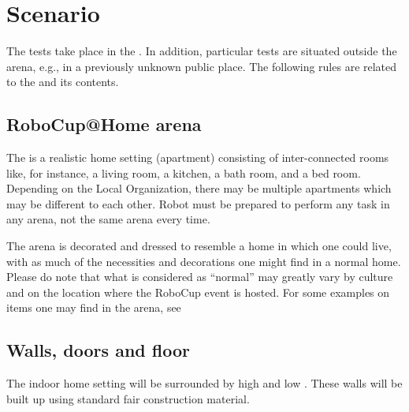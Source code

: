 \section{Scenario}
\label{sec:scenario}

The tests take place in the . In addition, particular tests are situated outside the arena, e.g., in a previously unknown public place. The following rules are related to the  and its contents. 

\subsection{RoboCup@Home arena}
The  is a realistic home setting (apartment) consisting of inter-connected rooms like, for instance, a living room, a kitchen, a bath room, and a bed room. 
Depending on the Local Organization, there may be multiple apartments which may be different to each other.
Robot must be prepared to perform any task in any arena, not the same arena every time. 

The arena is decorated and dressed to resemble a home in which one could live, with as much of the necessities and decorations one might find in a normal home. 
Please do note that what is considered as ``normal'' may greatly vary by culture and on the location where the RoboCup event is hosted. 
For some examples on items one may find in the arena, see 



\subsection{Walls, doors and floor}
\label{rule:scenario_walls}

The indoor home setting will be surrounded by high and low . These walls will be built up using standard fair construction material.

